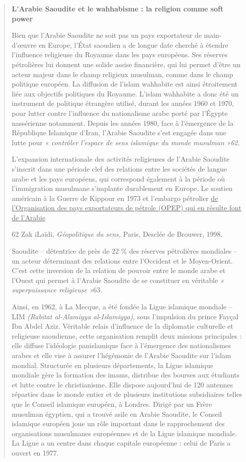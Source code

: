 \begin{quote}
\textbf{L'Arabie Saoudite et le wahhabisme : la religion comme soft
power}

Bien que l'Arabie Saoudite ne soit pas un pays exportateur de
main-d'œuvre en Europe, l'État saoudien a de longue date cherché à
étendre l'influence religieuse du Royaume dans les pays européens. Ses
réserves pétrolières lui donnent une solide assise financière, qui lui
permet d'être un acteur majeur dans le champ religieux musulman, comme
dans le champ politique européen. La diffusion de l'islam wahhabite est
ainsi étroitement liée aux objectifs politiques du Royaume. L'islam
wahhabite a donc été un instrument de politique étrangère utilisé,
durant les années 1960 et 1970, pour lutter contre l'influence du
nationalisme arabe porté par l'Égypte nassérienne notamment. Depuis les
années 1980, face à l'émergence de la République Islamique d'Iran,
l'Arabie Saoudite s'est engagée dans une lutte pour \emph{« contrôler
l'espace de sens islamique du monde musulman »62.}

L'expansion internationale des activités religieuses de l'Arabie
Saoudite s'inscrit dans une période clef des relations entre les
sociétés de langue arabe et les pays européens, qui correspond également
à la période où l'immigration musulmane s'implante durablement en
Europe. Le soutien américain à la Guerre de Kippour en 1973 et l'embargo
pétrolier \underline{de l'Organisation des pays exportateurs de pétrole
(OPEP) qui en résulte font de l'Arabie}

62 Zak iLaïdi, \emph{Géopolitique du sens,} Paris, Desclée de Brouwer,
1998.



Saoudite -- détentrice de près de 22 \% des réserves pétrolières
mondiales -- un acteur déterminant des relations entre l'Occident et le
Moyen-Orient. C'est cette inversion de la relation de pouvoir entre le
monde arabe et l'Ouest qui permet à l'Arabie Saoudite de se constituer
en véritable \emph{« superpuissance religieuse »}63\emph{.}

Ainsi, en 1962, à La Mecque, a été fondée la Ligue islamique mondiale --
LIM \emph{(Rabitat al-Alamiyya al-Islamiyya)}, sous l'impulsion du
prince Fayçal Ibn Abdel Aziz. Véritable relais d'influence de la
diplomatie culturelle et religieuse saoudienne, cette organisation
remplit deux missions principales : elle diffuse l'idéologie
panislamique face à l'émergence des nationalismes arabes et elle vise à
assurer l'hégémonie de l'Arabie Saoudite sur l'islam mondial. Structurée
en plusieurs départements, la Ligue islamique mondiale gère la formation
des imams, distribue des bourses aux étudiants et lutte contre le
christianisme. Elle dispose aujourd'hui de 120 antennes réparties dans
le monde entier et de plusieurs institutions subsidiaires telles que le
Conseil islamique européen, à Londres. Dirigé par un Frère musulman
égyptien, qui a trouvé asile en Arabie Saoudite, le Conseil islamique
européen joue un rôle important dans le rapprochement des organisations
musulmanes européennes et de la Ligue islamique mondiale. La Ligue a un
centre dans chaque capitale européenne : celui de Paris a ouvert en
1977.


\end{quote}
